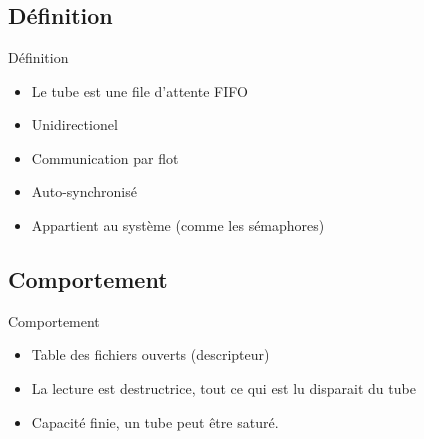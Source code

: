 \section{\sectitle}
\begin{frame}{\sectitle}
\def\subsectitle{Définition}
\subsection{\subsectitle}
\begin{block}{\subsectitle}
\begin{itemize}
    \item Le tube est une file d'attente FIFO
    \item Unidirectionel
    \item Communication par flot
    \item Auto-synchronisé
    \item Appartient au système (comme les sémaphores)
\end{itemize}
\end{block}

\def\subsectitle{Comportement}
\subsection{\subsectitle}
\begin{block}{\subsectitle}
\begin{itemize}
    \item Table des fichiers ouverts (descripteur)
    \item La lecture est destructrice, tout ce qui est lu disparait du tube
    \item Capacité finie, un tube peut être saturé.
\end{itemize}
\end{block}

\end{frame}



